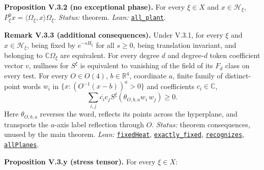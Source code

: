 \documentclass[
  letterpaper,
  11pt]{article}
\begin{document}
\textbf{Proposition V.3.2 (no exceptional phase).} For every
\(\xi\in X\) and \(x\in\mathcal H_\xi\),
\(P^0_\xi x=\langle\Omega_\xi,x\rangle\Omega_\xi\). \emph{Status:}
theorem. \emph{Lean:}
\href{https://github.com/yang-mills-group/OpenAI-YM-20261028/blob/3456e5e75cf8d4cd558955a5c7638fba2d68f464/YM/EveryPhase/Vacuum.lean\#L115-L144}{\texttt{all\_plant}}.

\textbf{Remark V.3.3 (additional consequences).} Under V.3.1, for every
\(\xi\) and \(x\in\mathcal H_\xi\), being fixed by \(e^{-sH_\xi}\) for
all \(s\ge0\), being translation invariant, and belonging to
\(\mathbb C\Omega_\xi\) are equivalent. For every degree \(d\) and
degree-\(d\) token coefficient vector \(v\), nullness for \(S^\xi\) is
equivalent to vanishing of the field of its \(F_d\) class on every test.
For every \(O\in O(4)\), \(b\in\mathbb R^4\), coordinate \(a\), finite
family of distinct-point words \(w_i\) in \(\{x:(O^{-1}(x-b))^a>0\}\)
and coefficients \(c_i\in\mathbb C\),
\[\sum_{i,j}\overline{c_i}c_jS^\xi(\theta_{O,b,a}w_i\,w_j)\ge0.\] Here
\(\theta_{O,b,a}\) reverses the word, reflects its points across the
hyperplane, and transports the \(a\)-axis label reflection through
\(O\). \emph{Status:} theorem consequences, unused by the main theorem.
\emph{Lean:}
\href{https://github.com/yang-mills-group/OpenAI-YM-20261028/blob/3456e5e75cf8d4cd558955a5c7638fba2d68f464/YM/EveryPhase/Extension.lean\#L100-L102}{\texttt{fixedHeat}},
\href{https://github.com/yang-mills-group/OpenAI-YM-20261028/blob/3456e5e75cf8d4cd558955a5c7638fba2d68f464/YM/EveryPhase/Extension.lean\#L103-L106}{\texttt{exactly\_fixed}},
\href{https://github.com/yang-mills-group/OpenAI-YM-20261028/blob/3456e5e75cf8d4cd558955a5c7638fba2d68f464/YM/EveryPhase/Extension.lean\#L90-L98}{\texttt{recognizes}},
\href{https://github.com/yang-mills-group/OpenAI-YM-20261028/blob/3456e5e75cf8d4cd558955a5c7638fba2d68f464/YM/EveryPhase/Extension.lean\#L84-L88}{\texttt{allPlanes}}.

\textbf{Proposition V.3.y (stress tensor).} For every \(\xi\in X\):
\end{document}

